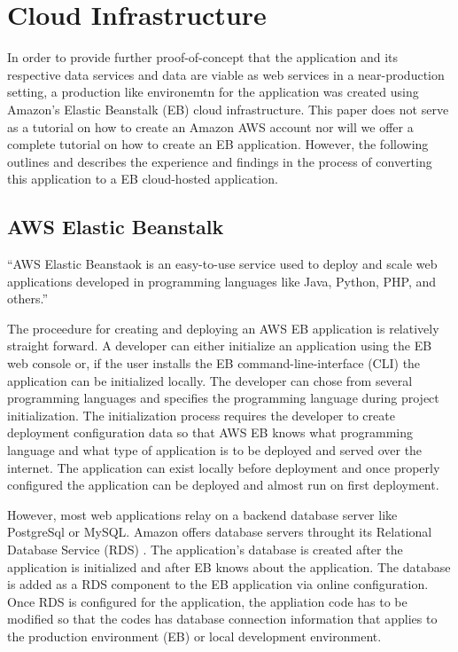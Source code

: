 \section{Cloud Infrastructure}
In order to provide further proof-of-concept that the application and its 
respective data services and data are viable as web services in a 
near-production setting, a production like environemtn for the application 
was created using Amazon's Elastic Beanstalk (EB) cloud infrastructure.  This 
paper does not serve as a tutorial on how to create an Amazon AWS account nor 
will we offer a complete tutorial on how to create an EB application.  
However, the following outlines and describes the experience and findings in 
the process of converting this application to a EB cloud-hosted application.

\subsection{AWS Elastic Beanstalk}
``AWS Elastic Beanstaok is an easy-to-use service used to deploy and scale web 
applications developed in programming languages like Java, Python, PHP, and 
others.''\cite{AWSEB2018}

The proceedure for creating and deploying an AWS EB application is relatively 
straight forward.  A developer can either initialize an application using the 
EB web console or, if the user installs the EB command-line-interface (CLI) 
the application can be initialized locally.  The developer can chose from 
several programming languages and specifies the programming language during 
project initialization.  The initialization process requires the developer to 
create deployment configuration data so that AWS EB knows what programming 
language and what type of application is to be deployed and served over the 
internet.  The application can exist locally before deployment and once properly 
configured the application can be deployed and almost run on first deployment.  

However, most web applications relay on a backend database server like 
PostgreSql or MySQL.  Amazon offers database servers throught its 
Relational Database Service (RDS) \cite{RDS2018}.  The application's 
database is created after the application is initialized and after EB knows 
about the application.  The database is added as a RDS component to the EB 
application via online configuration.  Once RDS is configured for the 
application, the appliation code has to be modified so that the codes has 
database connection information that applies to the production environment 
(EB) or local development environment.

